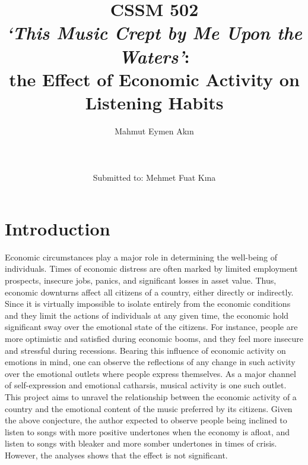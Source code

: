 \documentclass[12pt]{article}
\begin{document}
	\title{\textbf{CSSM 502} \\ \textit{‘This Music Crept by Me Upon the Waters’}: \\ the Effect of Economic Activity on Listening Habits }
	\author{
		Mahmut Eymen Akın \\
		\\
		\\
		\\
		Submitted to:
		Mehmet Fuat Kına}
	\date{}
	\maketitle{}
	\pagebreak
	\tableofcontents
	\pagebreak
\section{Introduction}
\begin{epigraphs}
\end{epigraphs}

Economic circumstances play a major role in determining the well-being of individuals. Times of economic distress are often marked by limited employment prospects, insecure jobs, panics, and significant losses in asset value. Thus, economic downturns affect all citizens of a country, either directly or indirectly. Since it is virtually impossible to isolate entirely from the economic conditions and they limit the actions of individuals at any given time, the economic hold significant sway over the emotional state of the citizens. For instance, people are more optimistic and satisfied during economic booms, and they feel more insecure and stressful during recessions. Bearing this influence of economic activity on emotions in mind, one can observe the reflections of any change in such activity over the emotional outlets where people express themselves. As a major channel of self-expression and emotional catharsis, musical activity is one such outlet. This project aims to unravel the relationship between the economic activity of a country and the emotional content of the music preferred by its citizens. Given the above conjecture, the author expected to observe people being inclined to listen to songs with more positive undertones when the economy is afloat, and listen to songs with bleaker and more somber undertones in times of crisis. However, the analyses shows that the effect is not significant.
\end{document}
